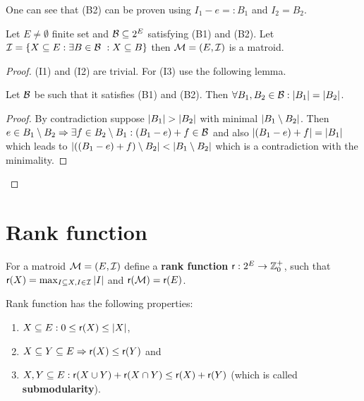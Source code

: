 One can see that (B2) can be proven using $I_1 - e =: B_1$ and $I_2 = B_2$.

\begin{prop}
	Let $E \neq \emptyset$ finite set and $\mathcal{B} \subseteq 2^E$ satisfying (B1) and (B2). Let $\mathcal{I} = \{X \subseteq E : \exists B \in \mathcal{B}\ : X \subseteq B\}$ then $\mathcal{M} = (E, \mathcal{I})$ is a matroid.
\end{prop}

\begin{proof}
	(I1) and (I2) are trivial. For (I3) use the following lemma.
	
	\begin{lemma}
		Let $\mathcal{B}$ be such that it satisfies (B1) and (B2). Then $\forall B_1, B_2 \in \mathcal{B} : |B_1| = |B_2|$.
	\end{lemma}
	
	\begin{proof}
		By contradiction suppose $\left|{B_1}\right| > \left|{B_2}\right|$ with minimal $\left|{B_1 \setminus B_2}\right|$. Then $e \in B_1 \setminus B_2 \Rightarrow \exists f \in B_2 \setminus B_1: (B_1 - e) + f \in \mathcal{B}$ and also $\left|{(B_1 - e) + f}\right| = |B_1|$ which leads to $\left|{((B_1 - e) + f) \setminus B_2}\right| < \left|{B_1 \setminus B_2}\right|$ which is a contradiction with the minimality.
	\end{proof}
\end{proof}

\section{Rank function}

\begin{defn}
	For a matroid $\mathcal{M} = (E, \mathcal{I})$ define a \textbf{rank function} $\operatorname{\textsf{r}} : 2^E \to \mathbb{Z}^+_0$, such that $\operatorname{\textsf{r}}(X) = \max_{I \subseteq X, I \in \mathcal{I}} |I|$ and $\operatorname{\textsf{r}} (\mathcal{M}) = \operatorname{\textsf{r}}(E)$.
\end{defn}

\begin{claim}
	Rank function has the following properties:
	
	\begin{enumerate}[(R1)]
		\item $X \subseteq E: 0 \leq \operatorname{\textsf{r}} (X) \leq |X|$,
		\item $X \subseteq Y \subseteq E \Rightarrow \operatorname{\textsf{r}} (X) \leq \operatorname{\textsf{r}}(Y)$ and
		\item $X, Y \subseteq E : \operatorname{\textsf{r}}(X \cup Y) + \operatorname{\textsf{r}}(X \cap Y) \leq \operatorname{\textsf{r}}(X) + \operatorname{\textsf{r}}(Y)$ (which is called \textbf{submodularity}).
	\end{enumerate}
\end{claim}

